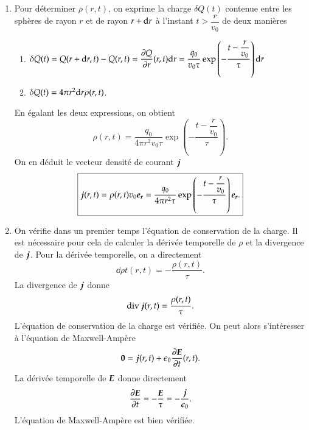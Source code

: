 \begin{corrige}
\begin{enumerate}
	\item Pour déterminer $\rho(r, t)$, on exprime la charge $\delta Q(t)$ contenue
	  entre les sphères de rayon $r$ et de rayon $r + \mathrm{d}r$ à l'instant 
	  $t > \dfrac{r}{v_0}$ de deux manières
	  \begin{enumerate}
		  \item $\delta Q(t) = Q(r + \mathrm{d}r, t) - Q(r, t) = \dfrac{\partial Q}{\partial r}(r, t) \mathrm{d}r
		  = \dfrac{q_0}{v_0 \tau} \exp\left(-\dfrac{t - \dfrac{r}{v_0}}
		  {\tau}\right) \mathrm{d}r$
	  	  \item $\delta Q(t) = 4 \pi r^2 \mathrm{d}r \rho(r, t)$.
	  \end{enumerate}
	  En égalant les deux expressions, on obtient
	  \begin{equation*}
		  \boxed{
		  \rho(r, t) = \dfrac{q_0}{4 \pi r^2 v_0 \tau}
		  \exp\left(-\dfrac{t - \dfrac{r}{v_0}} {\tau}\right).
	  }
	  \end{equation*}
	  On en déduit le vecteur densité de courant $\vecj$
	  \begin{equation*}
		  \boxed{
		  \vecj(r, t) = \rho(r, t) v_0 \er  = \dfrac{q_0}{4 \pi r^2 \tau}
		  \exp\left(-\dfrac{t - \dfrac{r}{v_0}} {\tau}\right) \er.
	  }
  	  \end{equation*}

  	\item On vérifie dans un premier temps l'équation de conservation de 
	  la charge. Il est nécessaire pour cela de calculer la dérivée temporelle
	  de $\rho$ et la divergence de $\vecj$. Pour la dérivée temporelle, 
	  on a directement
	  \begin{equation*}
		  \dd{\rho}{t}(r, t) = - \dfrac{\rho(r, t)}{\tau}.
	  \end{equation*}
	  La divergence de $\vecj$ donne
	  \begin{equation*}
		  \div \vecj(r, t) = \dfrac{\rho(r, t)}{\tau}.
	  \end{equation*}
	  L'équation de conservation de la charge est vérifiée. On peut alors
	  s'intéresser à l'équation de Maxwell-Ampère
	  \begin{equation*}
		  \vec{0} = \vecj(r, t) + \epsilon_0 \dd{\vece}{t}(r, t).
	  \end{equation*}
	  La dérivée temporelle de $\vece$ donne directement
	  \begin{equation*}
		  \dd{\vece}{t} = - \dfrac{\vece}{\tau} = - \dfrac{\vecj}{\epsilon_0}.
	  \end{equation*}
	  L'équation de Maxwell-Ampère est bien vérifiée.
	\end{enumerate}
\end{corrige}


